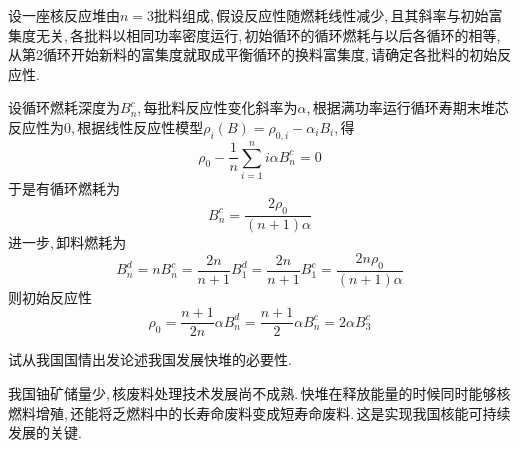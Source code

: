 \begin{exercise}
    设一座核反应堆由$n = 3$批料组成,\,假设反应性随燃耗线性减少,\,且其斜率与初始富集度无关,\,各批料以相同功率密度运行,\,初始循环的循环燃耗与以后各循环的相等,\,从第2循环开始新料的富集度就取成平衡循环的换料富集度,\,请确定各批料的初始反应性.\,
    \begin{solution}
        设循环燃耗深度为$B_n^c$,\,每批料反应性变化斜率为$\alpha$,\,根据满功率运行循环寿期末堆芯反应性为0,\,根据线性反应性模型$\rho_i(B) = \rho_{0,i} - \alpha_i B_i$,\,得
        \begin{equation*}
            \rho_0 - \frac{1}{n}\sum_{i=1}^{n} i \alpha B_n^c = 0
        \end{equation*}
        于是有循环燃耗为
        \begin{equation*}
            B_n^c = \frac{2\rho_0}{(n+1)\alpha}
        \end{equation*}
        进一步,\,卸料燃耗为
        \begin{equation*}
            B_n^d = n B_n^c = \frac{2n}{n+1}B_1^d = \frac{2n}{n+1}B_1^c = \frac{2n\rho_0}{(n+1)\alpha}
        \end{equation*}
        则初始反应性
        \begin{equation*}
            \rho_0 = \frac{n+1}{2n} \alpha B_n^d = \frac{n+1}{2} \alpha B_n^c = 2\alpha B_3^c
        \end{equation*}
    \end{solution}
\end{exercise}

\begin{exercise}
    试从我国国情出发论述我国发展快堆的必要性.\,
    \begin{solution}
        我国铀矿储量少,\,核废料处理技术发展尚不成熟.\,快堆在释放能量的时候同时能够核燃料增殖,\,还能将乏燃料中的长寿命废料变成短寿命废料.\,这是实现我国核能可持续发展的关键.\,
    \end{solution}
\end{exercise}